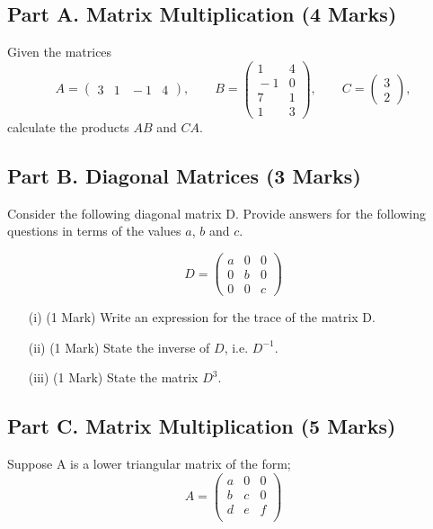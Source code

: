 \documentclass[a4paper,12pt]{article}
\begin{document}
	\subsection*{Part A. Matrix Multiplication (4 Marks)}	
	Given the matrices 
	$$
	A=\left(\begin{array}{cccc} 
	3&1&\!\!\!-1&4\end{array}
	\right), \qquad
	B =\left(\begin{array}{cc} 
	1&4\\ \!\!\!-1&0\\7&1\\1&3\end{array}
	\right), \qquad
	C=\left(\begin{array}{c} 3\\2\end{array}
	\right),
	$$
	calculate the products $AB$ and $CA$.
	\subsection*{Part B. Diagonal Matrices (3 Marks)}	
	Consider the following diagonal matrix D. Provide answers for the following questions in terms of the values $a$, $b$ and $c$.
	
	
	\[D = \left(\begin{array}{ccc}
		a & 0 & 0 \\ 
		0 & b & 0 \\ 
		0 & 0 & c
	\end{array} \right)\]
	\begin{itemize}
		\item[(i)] (1 Mark) Write an expression for the trace of the matrix D.
		\item[(ii)] (1 Mark) State the inverse of $D$, i.e. $D^{-1}$.
		\item[(iii)] (1 Mark) State the matrix $D^3$.
	\end{itemize}
	\smallskip
	\subsection*{Part C. Matrix Multiplication (5 Marks)}	
		Suppose A is a lower triangular matrix of the form;
		\[A = \left(
		\begin{matrix}
		a & 0 & 0 \\
		b & c & 0 \\
		d & e & f \\
		\end{matrix} \right)
		\]
		
\end{document}
